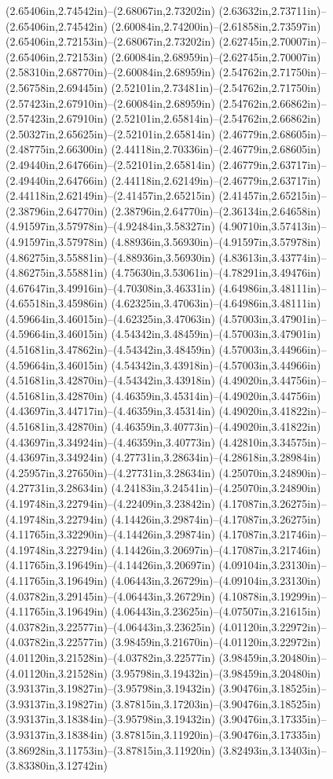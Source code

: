(2.65406in,2.74542in)--(2.68067in,2.73202in) (2.63632in,2.73711in)--(2.65406in,2.74542in) (2.60084in,2.74200in)--(2.61858in,2.73597in) (2.65406in,2.72153in)--(2.68067in,2.73202in) (2.62745in,2.70007in)--(2.65406in,2.72153in) (2.60084in,2.68959in)--(2.62745in,2.70007in) (2.58310in,2.68770in)--(2.60084in,2.68959in) (2.54762in,2.71750in)--(2.56758in,2.69445in) (2.52101in,2.73481in)--(2.54762in,2.71750in) (2.57423in,2.67910in)--(2.60084in,2.68959in) (2.54762in,2.66862in)--(2.57423in,2.67910in) (2.52101in,2.65814in)--(2.54762in,2.66862in) (2.50327in,2.65625in)--(2.52101in,2.65814in) (2.46779in,2.68605in)--(2.48775in,2.66300in) (2.44118in,2.70336in)--(2.46779in,2.68605in) (2.49440in,2.64766in)--(2.52101in,2.65814in) (2.46779in,2.63717in)--(2.49440in,2.64766in) (2.44118in,2.62149in)--(2.46779in,2.63717in) (2.44118in,2.62149in)--(2.41457in,2.65215in) (2.41457in,2.65215in)--(2.38796in,2.64770in) (2.38796in,2.64770in)--(2.36134in,2.64658in) (4.91597in,3.57978in)--(4.92484in,3.58327in) (4.90710in,3.57413in)--(4.91597in,3.57978in) (4.88936in,3.56930in)--(4.91597in,3.57978in) (4.86275in,3.55881in)--(4.88936in,3.56930in) (4.83613in,3.43774in)--(4.86275in,3.55881in) (4.75630in,3.53061in)--(4.78291in,3.49476in) (4.67647in,3.49916in)--(4.70308in,3.46331in) (4.64986in,3.48111in)--(4.65518in,3.45986in) (4.62325in,3.47063in)--(4.64986in,3.48111in) (4.59664in,3.46015in)--(4.62325in,3.47063in) (4.57003in,3.47901in)--(4.59664in,3.46015in) (4.54342in,3.48459in)--(4.57003in,3.47901in) (4.51681in,3.47862in)--(4.54342in,3.48459in) (4.57003in,3.44966in)--(4.59664in,3.46015in) (4.54342in,3.43918in)--(4.57003in,3.44966in) (4.51681in,3.42870in)--(4.54342in,3.43918in) (4.49020in,3.44756in)--(4.51681in,3.42870in) (4.46359in,3.45314in)--(4.49020in,3.44756in) (4.43697in,3.44717in)--(4.46359in,3.45314in) (4.49020in,3.41822in)--(4.51681in,3.42870in) (4.46359in,3.40773in)--(4.49020in,3.41822in) (4.43697in,3.34924in)--(4.46359in,3.40773in) (4.42810in,3.34575in)--(4.43697in,3.34924in) (4.27731in,3.28634in)--(4.28618in,3.28984in) (4.25957in,3.27650in)--(4.27731in,3.28634in) (4.25070in,3.24890in)--(4.27731in,3.28634in) (4.24183in,3.24541in)--(4.25070in,3.24890in) (4.19748in,3.22794in)--(4.22409in,3.23842in) (4.17087in,3.26275in)--(4.19748in,3.22794in) (4.14426in,3.29874in)--(4.17087in,3.26275in) (4.11765in,3.32290in)--(4.14426in,3.29874in) (4.17087in,3.21746in)--(4.19748in,3.22794in) (4.14426in,3.20697in)--(4.17087in,3.21746in) (4.11765in,3.19649in)--(4.14426in,3.20697in) (4.09104in,3.23130in)--(4.11765in,3.19649in) (4.06443in,3.26729in)--(4.09104in,3.23130in) (4.03782in,3.29145in)--(4.06443in,3.26729in) (4.10878in,3.19299in)--(4.11765in,3.19649in) (4.06443in,3.23625in)--(4.07507in,3.21615in) (4.03782in,3.22577in)--(4.06443in,3.23625in) (4.01120in,3.22972in)--(4.03782in,3.22577in) (3.98459in,3.21670in)--(4.01120in,3.22972in) (4.01120in,3.21528in)--(4.03782in,3.22577in) (3.98459in,3.20480in)--(4.01120in,3.21528in) (3.95798in,3.19432in)--(3.98459in,3.20480in) (3.93137in,3.19827in)--(3.95798in,3.19432in) (3.90476in,3.18525in)--(3.93137in,3.19827in) (3.87815in,3.17203in)--(3.90476in,3.18525in) (3.93137in,3.18384in)--(3.95798in,3.19432in) (3.90476in,3.17335in)--(3.93137in,3.18384in) (3.87815in,3.11920in)--(3.90476in,3.17335in) (3.86928in,3.11753in)--(3.87815in,3.11920in) (3.82493in,3.13403in)--(3.83380in,3.12742in) 